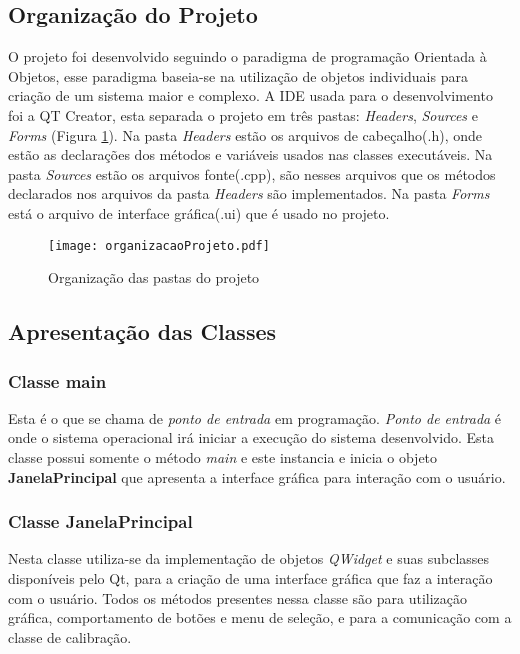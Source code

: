 \subsection{Organização do Projeto}
	 O projeto foi desenvolvido seguindo o paradigma de programação Orientada à Objetos, esse paradigma baseia-se na utilização de objetos individuais para criação de um sistema maior e complexo. A IDE usada para o desenvolvimento foi a QT Creator, esta separada o projeto em três pastas: {\it Headers}, {\it Sources} e {\it Forms} (Figura \ref{fig:OrganizacaoDoProjeto}). Na pasta {\it Headers} estão os arquivos de cabeçalho(.h), onde estão as declarações dos métodos e variáveis usados nas classes  executáveis. Na pasta {\it Sources} estão os arquivos fonte(.cpp), são nesses arquivos que os métodos declarados nos arquivos da pasta {\it Headers} são implementados. Na pasta {\it Forms} está o arquivo de interface gráfica(.ui) que é usado no projeto.
	 
	\begin{figure}[H]
		\centering
		\texttt{[image: organizacaoProjeto.pdf]}
		\caption{Organização das pastas do projeto}
		\label{fig:OrganizacaoDoProjeto}
	\end{figure}

\subsection{Apresentação das Classes}
\subsubsection{Classe main}
 Esta é o que se chama de \textit{ponto de entrada} em programação. \textit{Ponto de entrada} é onde o sistema operacional irá iniciar a execução do sistema desenvolvido. Esta classe possui somente o método \textit{main} e este instancia e inicia o objeto \textbf{JanelaPrincipal} que apresenta a interface gráfica para interação com o usuário.
 
\subsubsection{Classe JanelaPrincipal}
Nesta classe utiliza-se da implementação de objetos \textit{QWidget} e suas subclasses disponíveis pelo Qt, para a criação de uma interface gráfica que faz a interação com o usuário. Todos os métodos presentes nessa classe são para utilização gráfica, comportamento de botões e menu de seleção, e para a comunicação com a classe de calibração.	

